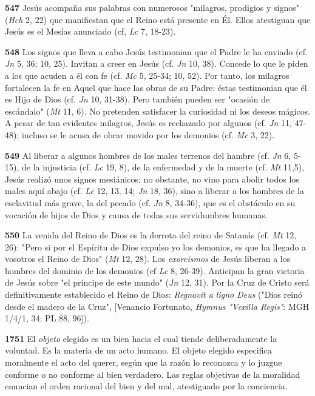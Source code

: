 \documentclass[]{article}
\begin{document}
\textbf{547} Jesús acompaña sus palabras con numerosos "milagros,
prodigios y signos" (\emph{Hch} 2, 22) que manifiestan que el Reino está
presente en Él. Ellos atestiguan que Jesús es el Mesías anunciado (cf,
\emph{Lc} 7, 18-23).

\textbf{548} Los signos que lleva a cabo Jesús testimonian que el Padre
le ha enviado (cf. \emph{Jn} 5, 36; 10, 25). Invitan a creer en Jesús
(cf. \emph{Jn} 10, 38). Concede lo que le piden a los que acuden a él
con fe (cf. \emph{Mc} 5, 25-34; 10, 52). Por tanto, los milagros
fortalecen la fe en Aquel que hace las obras de su Padre: éstas
testimonian que él es Hijo de Dios (cf. \emph{Jn} 10, 31-38). Pero
también pueden ser "ocasión de escándalo" (\emph{Mt} 11, 6). No
pretenden satisfacer la curiosidad ni los deseos mágicos. A pesar de tan
evidentes milagros, Jesús es rechazado por algunos (cf. \emph{Jn} 11,
47-48); incluso se le acusa de obrar movido por los demonios (cf.
\emph{Mc} 3, 22).

\textbf{549} Al liberar a algunos hombres de los males terrenos del
hambre (cf. \emph{Jn} 6, 5-15), de la injusticia (cf. \emph{Lc} 19, 8),
de la enfermedad y de la muerte (cf. \emph{Mt} 11,5), Jesús realizó unos
signos mesiánicos; no obstante, no vino para abolir todos los males aquí
abajo (cf. \emph{Lc} 12, 13. 14; \emph{Jn} 18, 36), sino a liberar a los
hombres de la esclavitud más grave, la del pecado (cf. \emph{Jn} 8,
34-36), que es el obstáculo en su vocación de hijos de Dios y causa de
todas sus servidumbres humanas.

\textbf{550} La venida del Reino de Dios es la derrota del reino de
Satanás (cf. \emph{Mt} 12, 26): "Pero si por el Espíritu de Dios expulso
yo los demonios, es que ha llegado a vosotros el Reino de Dios"
(\emph{Mt} 12, 28). Los \emph{exorcismos} de Jesús liberan a los hombres
del dominio de los demonios (cf \emph{Lc} 8, 26-39). Anticipan la gran
victoria de Jesús sobre "el príncipe de este mundo" (\emph{Jn} 12, 31).
Por la Cruz de Cristo será definitivamente establecido el Reino de Dios:
\emph{Regnavit a ligno Deus} ("Dios reinó desde el madero de la Cruz",
{[}Venancio Fortunato, \emph{Hymnus "Vexilla Regis"}: MGH 1/4/1, 34: PL
88, 96{]}).

\textbf{1751} El \emph{objeto} elegido es un bien hacia el cual tiende
deliberadamente la voluntad. Es la materia de un acto humano. El objeto
elegido especifica moralmente el acto del querer, según que la razón lo
reconozca y lo juzgue conforme o no conforme al bien verdadero. Las
reglas objetivas de la moralidad enuncian el orden racional del bien y
del mal, atestiguado por la conciencia.
\end{document}
